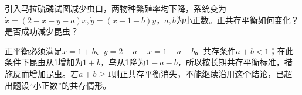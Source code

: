 \begin{exercise}\label{cw:rec25-5}
引入马拉硫磷试图减少虫口，两物种繁殖率均下降，系统变为$\dot x=(2-x-y-a)x,\dot y=(x-1-b)y$，$a,b$为小正数。正共存平衡如何变化？是否成功减少昆虫？
\end{exercise}
\begin{solution}
正平衡必须满足$x=1+b$、$y=2-a-x=1-a-b$。共存条件$a+b<1$；在此条件下昆虫从1增加为$1+b$，鸟从1降为$1-a-b$，所以按长期共存平衡标准，措施反而增加昆虫。若$a+b\ge1$则正共存平衡消失，不能继续沿用这个结论，已超出题设“小正数”的共存情形。
\par{}
\end{solution}

